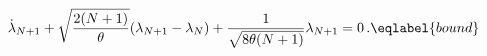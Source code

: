 \begin{equation}
\dot\lambda_{N+1} + \sqrt{\frac{2(N+1)}\theta} (\lambda_{N+1}-\lambda_N)
+ \frac{1}{\sqrt{8\theta (N+1)}} \lambda_{N+1} =0  \,.
\eqlabel{bound}
\end{equation}

